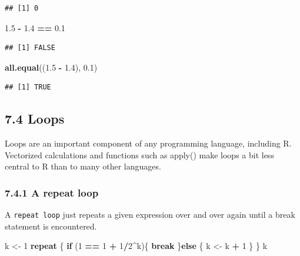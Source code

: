 \documentclass[]{article}
\newenvironment{Shaded}{\begin{snugshade}}{\end{snugshade}}
\newcommand{\KeywordTok}[1]{\textcolor[rgb]{0.13,0.29,0.53}{\textbf{#1}}}
\newcommand{\DecValTok}[1]{\textcolor[rgb]{0.00,0.00,0.81}{#1}}
\newcommand{\FloatTok}[1]{\textcolor[rgb]{0.00,0.00,0.81}{#1}}
\newcommand{\StringTok}[1]{\textcolor[rgb]{0.31,0.60,0.02}{#1}}
\newcommand{\ControlFlowTok}[1]{\textcolor[rgb]{0.13,0.29,0.53}{\textbf{#1}}}
\newcommand{\OperatorTok}[1]{\textcolor[rgb]{0.81,0.36,0.00}{\textbf{#1}}}
\newcommand{\NormalTok}[1]{#1}
\begin{document}
\begin{verbatim}
## [1] 0
\end{verbatim}

\begin{Shaded}
\begin{Highlighting}[]
\FloatTok{1.5} \OperatorTok{-}\StringTok{ }\FloatTok{1.4} \OperatorTok{==}\StringTok{ }\FloatTok{0.1}
\end{Highlighting}
\end{Shaded}

\begin{verbatim}
## [1] FALSE
\end{verbatim}

\begin{Shaded}
\begin{Highlighting}[]
\KeywordTok{all.equal}\NormalTok{((}\FloatTok{1.5} \OperatorTok{-}\StringTok{ }\FloatTok{1.4}\NormalTok{), }\FloatTok{0.1}\NormalTok{)}
\end{Highlighting}
\end{Shaded}

\begin{verbatim}
## [1] TRUE
\end{verbatim}

\subsection{7.4 Loops}\label{loops}

Loops are an important component of any programming language, including
R. Vectorized calculations and functions such as apply() make loops a
bit less central to R than to many other languages.

\subsubsection{7.4.1 A repeat loop}\label{a-repeat-loop}

A \texttt{repeat\ loop} just repeats a given expression over and over
again until a break statement is encountered.

\begin{Shaded}
\begin{Highlighting}[]
\NormalTok{k <-}\StringTok{ }\DecValTok{1}
\ControlFlowTok{repeat}\NormalTok{ \{}
  \ControlFlowTok{if}\NormalTok{ (}\DecValTok{1} \OperatorTok{==}\StringTok{ }\DecValTok{1} \OperatorTok{+}\StringTok{ }\DecValTok{1}\OperatorTok{/}\DecValTok{2}\OperatorTok{^}\NormalTok{k)\{}
    \ControlFlowTok{break}
\NormalTok{  \}}\ControlFlowTok{else}\NormalTok{ \{}
\NormalTok{    k <-}\StringTok{ }\NormalTok{k }\OperatorTok{+}\StringTok{ }\DecValTok{1}
\NormalTok{  \}}
\NormalTok{\}}
\NormalTok{k}
\end{Highlighting}
\end{Shaded}
\end{document}

